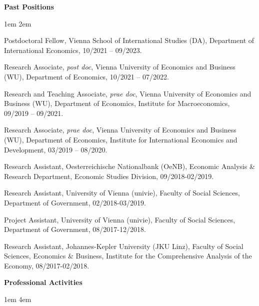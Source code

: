 \documentclass{resume} %
\begin{document}
\vspace{0.5cm}
{\textbf{\large Past Positions}}
\par \begingroup \leftskip1em \rightskip2em 
\par \begingroup
Postdoctoral Fellow, Vienna School of International Studies (DA), Department of International Economics, 10/2021 -- 09/2023.
\par \endgroup
\par \begingroup
Research Associate, \textit{post doc}, Vienna University of Economics and Business (WU), Department of Economics, 10/2021 -- 07/2022.
\par \endgroup
\par \begingroup
Research and Teaching Associate, \textit{prae doc}, Vienna University of Economics and Business (WU), Department of Economics, Institute for Macroeconomics, 09/2019 -- 09/2021.
\par \endgroup
\par \begingroup
Research Associate, \textit{prae doc}, Vienna University of Economics and Business (WU), Department of Economics, Institute for International Economics and Development, 03/2019 -- 08/2020.
\par \endgroup
\par \begingroup
Research Assistant, Oesterreichische Nationalbank (OeNB), Economic Analysis \& Research Department, Economic Studies Division, 09/2018-02/2019.
\par \endgroup
\par \begingroup 
Research Assistant, University of Vienna (univie), Faculty of Social Sciences, Department of Government, 02/2018-03/2019.
\par \endgroup
\par \begingroup
Project Assistant, University of Vienna (univie), Faculty of Social Sciences, Department of Government, 08/2017-12/2018.
\par \endgroup
\par \begingroup
Research Assistant, Johannes-Kepler University (JKU Linz), Faculty of Social Sciences, Economics \& Business, Institute for the Comprehensive Analysis of the Economy, 08/2017-02/2018.
\par \endgroup
\par \endgroup

\vspace{0.5cm}
{\textbf{\large Professional Activities}}
\par \begingroup \leftskip1em \rightskip4em
\end{document}
